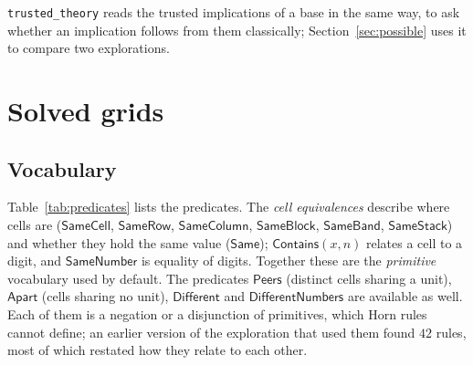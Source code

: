 \documentclass[11pt,a4paper]{article}
\theoremstyle{definition}
\theoremstyle{remark}
\newcommand{\code}[1]{\texttt{#1}}
\newcommand{\pred}[1]{\mathsf{#1}}
\begin{document}
\code{trusted\_theory} reads the trusted implications of a base in the same way, to ask whether an implication follows from them classically; Section~\ref{sec:possible} uses it to compare two explorations.

\section{Solved grids}\label{sec:solved}

\subsection{Vocabulary}

Table~\ref{tab:predicates} lists the predicates. The \emph{cell equivalences} describe where cells are ($\pred{SameCell}$, $\pred{SameRow}$, $\pred{SameColumn}$, $\pred{SameBlock}$, $\pred{SameBand}$, $\pred{SameStack}$) and whether they hold the same value ($\pred{Same}$); $\pred{Contains}(x, n)$ relates a cell to a digit, and $\pred{SameNumber}$ is equality of digits. Together these are the \emph{primitive} vocabulary used by default. The predicates $\pred{Peers}$ (distinct cells sharing a unit), $\pred{Apart}$ (cells sharing no unit), $\pred{Different}$ and $\pred{DifferentNumbers}$ are available as well. Each of them is a negation or a disjunction of primitives, which Horn rules cannot define; an earlier version of the exploration that used them found $42$ rules, most of which restated how they relate to each other.
\end{document}
